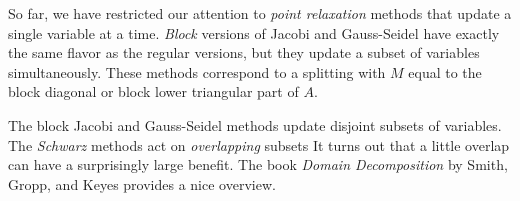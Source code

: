 So far, we have restricted our attention to {\em point relaxation} methods
that update a single variable at a time.  {\em Block} versions of Jacobi and
Gauss-Seidel have exactly the same flavor as the regular versions, but they
update a subset of variables simultaneously.  These methods correspond to a
splitting with $M$ equal to the block diagonal or block lower triangular part
of $A$.

The block Jacobi and Gauss-Seidel methods update disjoint subsets of
variables.  The {\em Schwarz} methods act on {\em overlapping} subsets
It turns out that a little overlap can have a surprisingly large benefit.
The book {\em Domain Decomposition} by Smith, Gropp, and Keyes provides a
nice overview.
